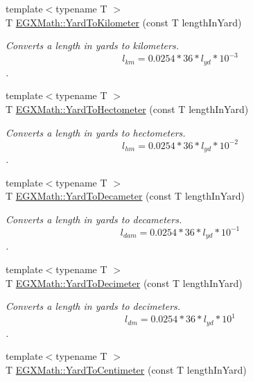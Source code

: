 \begin{DoxyCompactItemize}
{\footnotesize template$<$typename T $>$ }\\T \mbox{\hyperlink{group___e_g_x_math-_conversions-_length_conversions-_imperial-_yard-_s_i_ga035659a5d1e693eaeda9b012fe59a44f}{E\+G\+X\+Math\+::\+Yard\+To\+Kilometer}} (const T length\+In\+Yard)
\begin{DoxyCompactList}\small\item\em Converts a length in yards to kilometers. \[ l_{km}=0.0254 * 36 * l_{yd} * 10^{-3} \]. \end{DoxyCompactList}\item 
{\footnotesize template$<$typename T $>$ }\\T \mbox{\hyperlink{group___e_g_x_math-_conversions-_length_conversions-_imperial-_yard-_s_i_ga7aa38196844c4bec3698c86ce582af65}{E\+G\+X\+Math\+::\+Yard\+To\+Hectometer}} (const T length\+In\+Yard)
\begin{DoxyCompactList}\small\item\em Converts a length in yards to hectometers. \[ l_{hm}=0.0254 * 36 * l_{yd} * 10^{-2} \]. \end{DoxyCompactList}\item 
{\footnotesize template$<$typename T $>$ }\\T \mbox{\hyperlink{group___e_g_x_math-_conversions-_length_conversions-_imperial-_yard-_s_i_gafcf72603effbca33bde09d34475d88b4}{E\+G\+X\+Math\+::\+Yard\+To\+Decameter}} (const T length\+In\+Yard)
\begin{DoxyCompactList}\small\item\em Converts a length in yards to decameters. \[ l_{dam}=0.0254 * 36 * l_{yd} * 10^{-1} \]. \end{DoxyCompactList}\item 
{\footnotesize template$<$typename T $>$ }\\T \mbox{\hyperlink{group___e_g_x_math-_conversions-_length_conversions-_imperial-_yard-_s_i_ga2d9f995bf166959fcfdcceb61e6b6062}{E\+G\+X\+Math\+::\+Yard\+To\+Decimeter}} (const T length\+In\+Yard)
\begin{DoxyCompactList}\small\item\em Converts a length in yards to decimeters. \[ l_{dm}=0.0254 * 36 * l_{yd} * 10^{1} \]. \end{DoxyCompactList}\item 
{\footnotesize template$<$typename T $>$ }\\T \mbox{\hyperlink{group___e_g_x_math-_conversions-_length_conversions-_imperial-_yard-_s_i_gaf49d610207ac1f0469190e6a06d10a42}{E\+G\+X\+Math\+::\+Yard\+To\+Centimeter}} (const T length\+In\+Yard)

\end{DoxyCompactItemize}

